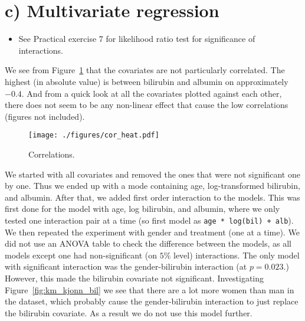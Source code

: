 \documentclass[11pt,a4paper]{article}
\begin{document}
\section{c) Multivariate regression}
\begin{itemize}
    \item See Practical exercise 7 for likelihood ratio test for significance of interactions.
\end{itemize}



We see from Figure~\ref{fig:cor_heat} that the covariates are not particularly correlated. The highest (in absolute value) is between bilirubin and albumin on approximately $-0.4$. And from a quick look at all the covariates plotted against each other, there does not seem to be any non-linear effect that cause the low correlations (figures not included).
%
\begin{figure}[h!tb]
    \begin{center}
        \texttt{[image: ./figures/cor\_heat.pdf]}
    \end{center}
    \vspace{-0.8cm}
    \caption{Correlations.}
    \label{fig:cor_heat}
\end{figure}

We started with all covariates and removed the ones that were not significant one by one. Thus we ended up with a mode containing age, log-transformed bilirubin, and albumin.
After that, we added first order interaction to the models. This was first done for the model with age, log bilirubin, and albumin, where we only tested one interaction pair at a time (so first model as \verb$age * log(bil) + alb$). We then repeated the experiment with gender and treatment (one at a time). We did not use an ANOVA table to check the difference between the models, as all models except one had non-significant (on $5\%$ level) interactions.
The only model with significant interaction was the gender-bilirubin interaction (at $p=0.023$.) However, this made the bilirubin covariate not significant. Investigating Figure~\ref{fig:km_kjonn_bil} we see that there are a lot more women than man in the dataset, which probably cause the gender-bilirubin interaction to just replace the bilirubin covariate. As a result we do not use this model further.
\end{document}
